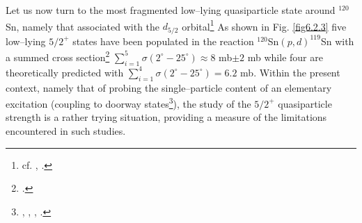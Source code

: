     
    
  Let us now turn to the most fragmented low--lying quasiparticle state around $^{120}$Sn, namely that associated with the $d_{5/2}$ orbital\footnote{cf. \cite{Idini:13}, \cite{Idini:15}.} As shown in Fig. \ref{fig6.2.3} five low--lying $5/2^+$ states have been populated in the 	reaction  $^{120}$Sn$(p,d)^{119}$Sn with a summed cross section\footnote{\cite{Dickey:82}.} $\sum_{i=1}^5 \sigma(2^\circ-25^\circ)\approx 8$ mb$\pm 2$ mb  while four are theoretically predicted with $\sum_{i=1}^4\sigma(2^\circ-25^\circ)= 6.2$ mb.
  Within the  present context, namely that of probing the single--particle 	content of an elementary excitation (coupling to doorway states\footnote{\cite{Feshbach:58}, \cite{Rawitscher:87}, \cite{Bortignon:81}, \cite{Bertsch:83}.}), the study of the $5/2^+$ quasiparticle strength is a rather trying situation, providing a measure of the limitations encountered in such studies. 
  
